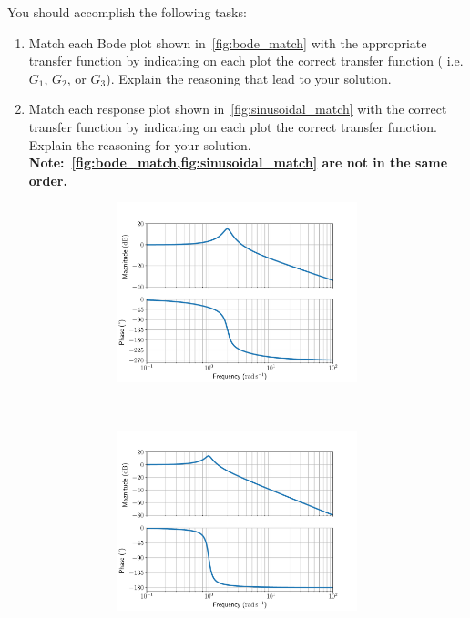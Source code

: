 \documentclass[titlepage, 11pt, reqno]{article}    %
\begin{document}
You should accomplish the following tasks:
\begin{enumerate}
    \item Match each Bode plot shown in~\cref{fig:bode_match}  with the appropriate transfer function by indicating on each plot the correct transfer function ( i.e. \(G_1\), \(G_2\), or \(G_3\)).
        Explain the reasoning that lead to your solution.
    \item Match each response plot shown in~\cref{fig:sinusoidal_match} with the correct transfer function by indicating on each plot the correct transfer function. 
        Explain the reasoning for your solution.
        \textbf{Note:~\cref{fig:bode_match,fig:sinusoidal_match} are not in the same order.}
\end{enumerate}
\begin{figure}[h]
    \centering
    \begin{subfigure}{0.38\textwidth}
        \centering
        \begin{subfigure}[htbp]{\textwidth} 
            \includegraphics[width=\textwidth]{figures/G3_bode.pdf} 
        \end{subfigure}\\
        \begin{subfigure}[htbp]{\textwidth} 
            \includegraphics[width=\textwidth]{figures/G1_bode.pdf} 

\end{subfigure}
\end{subfigure}
\end{figure}
\end{document}
